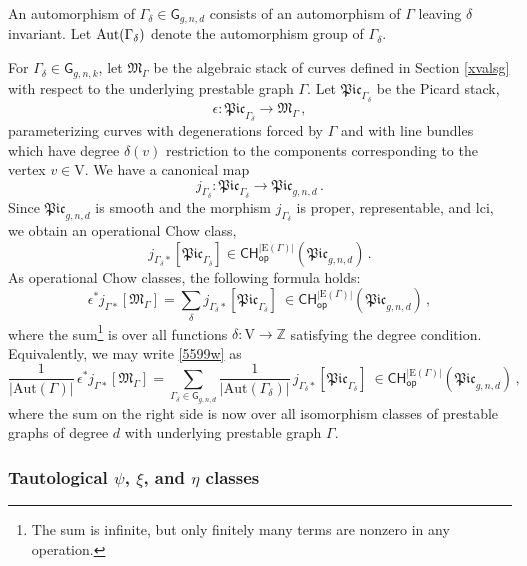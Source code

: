\documentclass[a4paper,12pt]{article} %
\def\Aut{{\rm Aut}}
\def\E{\mathrm{E}}
\def\V{\mathrm{V}}
\def\G{\mathsf{G}}
\theoremstyle{definition}
\theoremstyle{plain}%
\newcommand{\Picabs}{\mathfrak{Pic}}
\begin{document}
An automorphism of $\Gamma_\delta \in \G_{g,n,d}$ 
consists of an automorphism of $\Gamma$
leaving $\delta$ invariant.
Let $\Aut(\Gamma_\delta)$ denote the automorphism group of $\Gamma_\delta$.



For $\Gamma_\delta\in \mathsf{G}_{g,n,k}$, let $\mathfrak{M}_\Gamma$ be the algebraic stack of
curves defined in Section \ref{xvalsg} with respect to the underlying prestable graph $\Gamma$. 
Let
$\Picabs_{\Gamma_\delta}$ be the Picard stack,
$$\epsilon:\Picabs_{\Gamma_\delta} \rightarrow \mathfrak{M}_{\Gamma}\, ,$$
parameterizing curves with degenerations forced by $\Gamma$ and with  line bundles which
have 
degree $\delta(v)$ restriction to the components corresponding to the vertex $v\in \V$.
We have a
canonical map
$$j_{\Gamma_\delta} : \Picabs_{\Gamma_\delta} \to \Picabs_{g,n,d}\, .$$
Since $\Picabs_{g,n,d}$ is smooth and
the morphism $j_{\Gamma_\delta}$ is proper, representable, and lci,
we obtain an operational Chow class,
$$j_{\Gamma_\delta *}[\Picabs_{\Gamma_\delta}] \in \mathsf{CH}_{\mathsf{op}}^{|\E(\Gamma)|}(\Picabs_{g,n,d})\, .$$
As operational Chow classes, the following formula holds:
\begin{equation}\label{5599w}
\epsilon^*j_{\Gamma*}[\mathfrak{M}_\Gamma] = \sum_{\delta} j_{\Gamma_\delta *}[\Picabs_{\Gamma_\delta}]
\ \in \mathsf{CH}_{\mathsf{op}}^{|\E(\Gamma)|}(\Picabs_{g,n,d})
\, ,
\end{equation}
where the sum{\footnote{The sum is infinite, but only finitely many terms
are nonzero in any operation.}} is over all functions $\delta:\V \rightarrow \mathbb{Z}$ satisfying the degree condition.
Equivalently, we may write \eqref{5599w} as
\begin{equation*}
\frac{1}{|{\text{Aut}}(\Gamma)|}\, \epsilon^*j_{\Gamma*}[\mathfrak{M}_\Gamma] = 
\sum_{\Gamma_\delta\in \mathsf{G}_{g,n,d}} 
\frac{1}{|{\text{Aut}}(\Gamma_\delta)|}\, 
j_{\Gamma_\delta *}[\Picabs_{\Gamma_\delta}]\ 
\in \mathsf{CH}_{\mathsf{op}}^{|\E(\Gamma)|}(\Picabs_{g,n,d})
\, ,
\end{equation*}
where the sum on the right side is now over all isomorphism classes of
prestable graphs of degree $d$ with underlying prestable graph $\Gamma$.

\subsubsection{Tautological \texorpdfstring{$\psi$}{psi}, \texorpdfstring{$\xi$}{xi}, and \texorpdfstring{$\eta$}{eta} classes} \label{Ssec:PsiXiEta}
\end{document}
